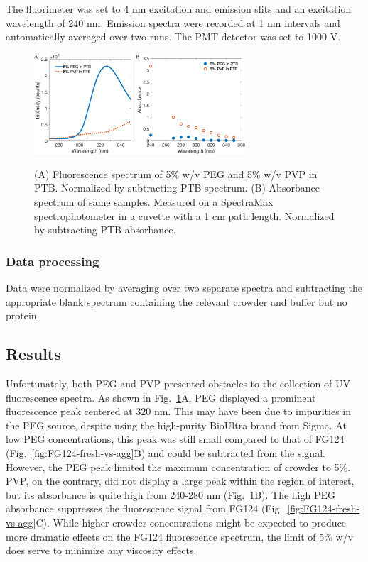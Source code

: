 The fluorimeter was set to 4 nm excitation and emission slits and an excitation wavelength of 240 nm.  Emission spectra were recorded at 1 nm intervals and automatically averaged over two runs.  The PMT detector was set to 1000 V.

\begin{figure}
\caption[Fluorescence and absorbance of crowders.]{(A) Fluorescence spectrum of 5\% w/v PEG and 5\% w/v PVP in PTB.  Normalized by subtracting PTB spectrum.  (B) Absorbance spectrum of same samples.  Measured on a SpectraMax spectrophotometer in a cuvette with a 1 cm path length.  Normalized by subtracting PTB absorbance.}
\centering
\includegraphics[width=0.7\textwidth]{figs/ch05/crowder-properties}
\label{fig:crowder-prop}
\end{figure}

\subsubsection{Data processing}
Data were normalized by averaging over two separate spectra and subtracting the appropriate blank spectrum containing the relevant crowder and buffer but no protein.

\subsection{Results}
Unfortunately, both PEG and PVP presented obstacles to the collection of UV fluorescence spectra. As shown in Fig.~\ref{fig:crowder-prop}A, PEG displayed a prominent fluorescence peak centered at 320 nm.  This may have been due to impurities in the PEG source, despite using the high-purity BioUltra brand from Sigma.  At low PEG concentrations, this peak was still small compared to that of FG124 (Fig.~\ref{fig:FG124-fresh-vs-agg}B) and could be subtracted from the signal.  However, the PEG peak limited the maximum concentration of crowder to 5\%.  PVP, on the contrary, did not display a large peak within the region of interest, but its absorbance is quite high from 240-280 nm (Fig.~\ref{fig:crowder-prop}B).  The high PEG absorbance suppresses the fluorescence signal from FG124 (Fig.~\ref{fig:FG124-fresh-vs-agg}C).  While higher crowder concentrations might be expected to produce more dramatic effects on the FG124 fluorescence spectrum, the limit of 5\% w/v does serve to minimize any viscosity effects.

